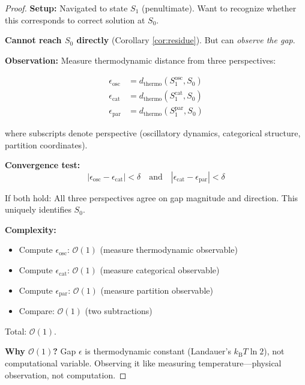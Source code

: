 \documentclass[twocolumn,10pt]{revtex4-2}
\theoremstyle{definition}
\theoremstyle{remark}
\newcommand{\kB}{k_{\mathrm{B}}}
\newcommand{\bigO}{\mathcal{O}}
\begin{document}
\begin{proof}
\textbf{Setup:} Navigated to state $S_1$ (penultimate). Want to recognize whether this corresponds to correct solution at $S_0$.

\vspace{0.2cm}
\noindent\textbf{Cannot reach $S_0$ directly} (Corollary \ref{cor:residue}). But can \textit{observe the gap}.

\vspace{0.2cm}
\noindent\textbf{Observation:} Measure thermodynamic distance from three perspectives:

\begin{align}
\epsilon_{\text{osc}} &= d_{\text{thermo}}(S_1^{\text{osc}}, S_0) \\
\epsilon_{\text{cat}} &= d_{\text{thermo}}(S_1^{\text{cat}}, S_0) \\
\epsilon_{\text{par}} &= d_{\text{thermo}}(S_1^{\text{par}}, S_0)
\end{align}

where subscripts denote perspective (oscillatory dynamics, categorical structure, partition coordinates).

\vspace{0.2cm}
\noindent\textbf{Convergence test:}
\begin{equation}
|\epsilon_{\text{osc}} - \epsilon_{\text{cat}}| < \delta \quad \text{and} \quad |\epsilon_{\text{cat}} - \epsilon_{\text{par}}| < \delta
\end{equation}

If both hold: All three perspectives agree on gap magnitude and direction. This uniquely identifies $S_0$.

\vspace{0.2cm}
\noindent\textbf{Complexity:}
\begin{itemize}
\item Compute $\epsilon_{\text{osc}}$: $\bigO(1)$ (measure thermodynamic observable)
\item Compute $\epsilon_{\text{cat}}$: $\bigO(1)$ (measure categorical observable)
\item Compute $\epsilon_{\text{par}}$: $\bigO(1)$ (measure partition observable)
\item Compare: $\bigO(1)$ (two subtractions)
\end{itemize}

Total: $\bigO(1)$.

\vspace{0.2cm}
\noindent\textbf{Why $\bigO(1)$?} Gap $\epsilon$ is thermodynamic constant (Landauer's $\kB T \ln 2$), not computational variable. Observing it like measuring temperature—physical observation, not computation.
\end{proof}
\end{document}
